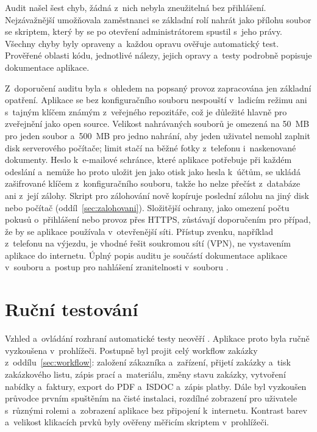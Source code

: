 Audit našel šest chyb, žádná z~nich nebyla zneužitelná bez přihlášení. Nejzávažnější umožňovala zaměstnanci se základní rolí nahrát jako přílohu soubor se skriptem, který by se po otevření administrátorem spustil s~jeho právy. Všechny chyby byly opraveny a~každou opravu ověřuje automatický test. Prověřené oblasti kódu, jednotlivé nálezy, jejich opravy a~testy podrobně popisuje dokumentace aplikace.

Z~doporučení auditu byla s~ohledem na popsaný provoz zapracována jen základní opatření. Aplikace se bez konfiguračního souboru nespouští v~ladicím režimu ani s~tajným klíčem známým z~veřejného repozitáře, což je důležité hlavně pro zveřejnění jako open source. Velikost nahrávaných souborů je omezená na 50~MB pro jeden soubor a~500~MB pro jedno nahrání, aby jeden uživatel nemohl zaplnit disk serverového počítače; limit stačí na běžné fotky z~telefonu i~naskenované dokumenty. Heslo k~e-mailové schránce, které aplikace potřebuje při každém odeslání a~nemůže ho proto uložit jen jako otisk jako hesla k~účtům, se ukládá zašifrované klíčem z~konfiguračního souboru, takže ho nelze přečíst z~databáze ani z~její zálohy. Skript pro zálohování nově kopíruje poslední zálohu na jiný disk nebo počítač (oddíl~\ref{sec:zalohovani}). Složitější ochrany, jako omezení počtu pokusů o~přihlášení nebo provoz přes HTTPS, zůstávají doporučením pro případ, že by se aplikace používala v~otevřenější síti. Přístup zvenku, například z~telefonu na výjezdu, je vhodné řešit soukromou sítí (VPN), ne vystavením aplikace do internetu. Úplný popis auditu je součástí dokumentace aplikace v~souboru  a~postup pro nahlášení zranitelnosti v~souboru .

\section{Ruční testování}\label{sec:testovani-rucni}

Vzhled a~ovládání rozhraní automatické testy neověří \cite[s.~231]{Sommerville2016}. Aplikace proto byla ručně vyzkoušena v~prohlížeči. Postupně byl projit celý workflow zakázky z~oddílu~\ref{sec:workflow}: založení zákazníka a~zařízení, přijetí zakázky a~tisk zakázkového listu, zápis prací a~materiálu, změny stavu zakázky, vytvoření nabídky a~faktury, export do PDF a~ISDOC a~zápis platby. Dále byl vyzkoušen průvodce prvním spuštěním na čisté instalaci, rozdílné zobrazení pro uživatele s~různými rolemi a~zobrazení aplikace bez připojení k~internetu. Kontrast barev a~velikost klikacích prvků byly ověřeny měřicím skriptem v~prohlížeči.

